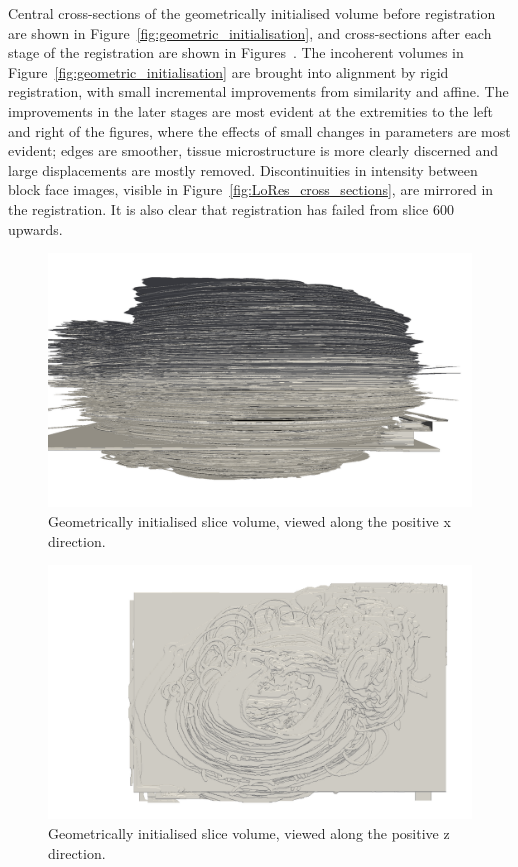 	Central cross-sections of the geometrically initialised volume before registration are shown in Figure~\ref{fig:geometric_initialisation}, and cross-sections after each stage of the registration are shown in Figures~. The incoherent volumes in Figure~\ref{fig:geometric_initialisation} are brought into alignment by rigid registration, with small incremental improvements from similarity and affine. The improvements in the later stages are most evident at the extremities to the left and right of the figures, where the effects of small changes in parameters are most evident; edges are smoother, tissue microstructure is more clearly discerned and large displacements are mostly removed. Discontinuities in intensity between block face images, visible in Figure~\ref{fig:LoRes_cross_sections}, are mirrored in the registration. It is also clear that registration has failed from slice 600 upwards.
	
	\begin{figure}
	  \centering
	  \includegraphics[width=0.9\textheight]{Ch6/Figs/Rat28/contours/whole_positive_x_geometric}
	  \caption{Geometrically initialised slice volume, viewed along the positive x direction.}
	  \label{fig:positive_x_geometric_contour}
	\end{figure}

	\begin{figure}
	  \centering
	  \includegraphics[width=0.9\textheight]{Ch6/Figs/Rat28/contours/whole_positive_z_geometric}
	  \caption{Geometrically initialised slice volume, viewed along the positive z direction.}
	  \label{fig:positive_z_geometric_contour}
	\end{figure}

